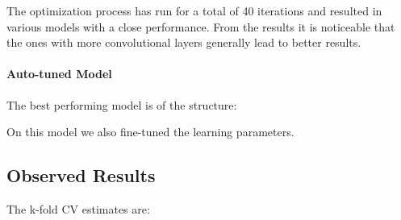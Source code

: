 The optimization process has run for a total of 40 iterations and resulted in various models with a close performance.
From the results it is noticeable that the ones with more convolutional layers generally lead to better results.

\paragraph{Auto-tuned Model}

The best performing model is of the structure:

On this model we also fine-tuned the learning parameters. %

\subsection{Observed Results}

The k-fold CV estimates are:
